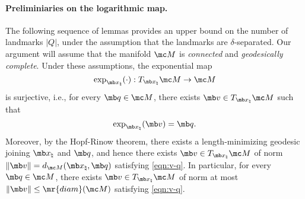 

\paragraph{Preliminiaries on the logarithmic map.}

{
The following sequence of lemmas provides an upper bound on the number of landmarks $|Q|$, under the assumption that the landmarks are $\delta$-separated. Our argument will assume that the manifold $\mc M$ is {\em connected} and {\em geodesically complete}. Under these assumptions, the exponential map 
\begin{equation}
    \exp_{\mb x_\natural}(\cdot) : T_{\mb x_\natural} \mc M \to \mc M
\end{equation}
is surjective, i.e., for every $\mb q \in \mc M$, there exists $\mb v \in T_{\mb x_\natural}\mc M$ such that 
\begin{equation} \label{eqn:v-q}
    \exp_{\mb x_\natural}(\mb v) = \mb q.
\end{equation} 
Moreover, by the Hopf-Rinow theorem, there exists a length-minimizing geodesic joining $\mb x_\natural$ and $\mb q$, and hence there exists $\mb v \in T_{\mb x_\natural} \mc M$ of norm $\| \mb v \| = d_{\mc M}(\mb x_\natural, \mb q )$ satisfying \eqref{eqn:v-q}. In particular, for every $\mb q \in \mc M$, there exists $\mb v \in T_{\mb x_\natural} \mc M$ of norm at most $\| \mb v \| \le \mr{diam}(\mc M)$ satisfying \eqref{eqn:v-q}. 

}
